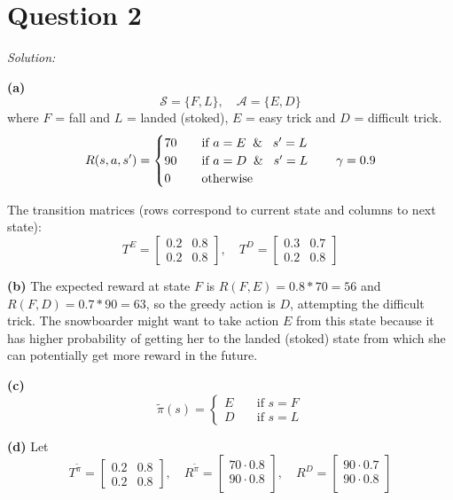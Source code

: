 \documentclass{article}
\theoremstyle{definition}
\newenvironment{solution}{\noindent\textit{Solution:}}{}
\begin{document}
\newpage

\section*{Question 2}

\begin{solution}

\textbf{(a)}
\[
\mathcal{S} = \{F, L\}, \quad \mathcal{A} = \{E, D\}
\]
where $F$ = fall and $L$ = landed (stoked), $E$ = easy trick and $D$ = difficult trick.
\[
R(s,a,s') = \begin{cases}
    70 \quad& \text{if } a=E \And \; s' = L\\
    90 \quad& \text{if } a=D \And \; s' = L\\
    0 \quad& \text{otherwise}
\end{cases}
\qquad \gamma = 0.9
\]

The transition matrices (rows correspond to current state and columns to next state):
\[
T^E = \begin{bmatrix}
    0.2 & 0.8 \\
    0.2 & 0.8
\end{bmatrix}, \quad T^D = \begin{bmatrix}
    0.3 & 0.7 \\
    0.2 & 0.8
\end{bmatrix}
\]

\textbf{(b)}
The expected reward at state $F$ is $R(F, E) = 0.8*70 = 56$ and $R(F, D) = 0.7*90 = 63$, so the greedy action is $D$, attempting the difficult trick. The snowboarder might want to take action $E$ from this state because it has higher probability of getting her to the landed (stoked) state from which she can potentially get more reward in the future.

\textbf{(c)}
\[
\tilde{\pi}(s) = \begin{cases}
    E \quad & \text{if } s=F \\
    D \quad & \text{if } s=L
\end{cases}
\]

\textbf{(d)}
Let
\[
T^{\tilde{\pi}} = \begin{bmatrix}
    0.2 & 0.8 \\
    0.2 & 0.8
\end{bmatrix}, \quad
R^{\tilde{\pi}} = \begin{bmatrix}
    70 \cdot 0.8 \\
    90 \cdot 0.8 \\
\end{bmatrix}, \quad
R^D = \begin{bmatrix}
    90 \cdot 0.7 \\
    90 \cdot 0.8 \\
\end{bmatrix}
\]


\end{solution}
\end{document}
